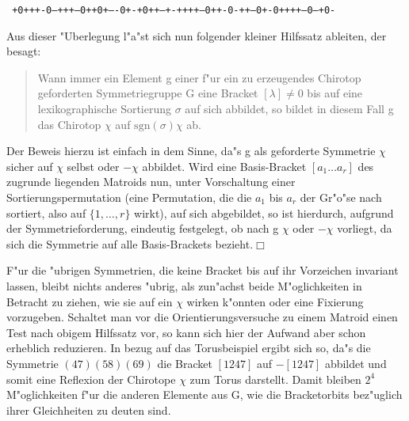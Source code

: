 \centerline{\small\tt
+0+++-0--+++--0++0+----0+-+0++---+-++++---0++-0-++--0+-0++++---0---+0-
}\vskip4mm

Aus dieser "Uberlegung l"a"st sich nun folgender kleiner Hilfssatz ableiten, der
besagt:
\begin{quote}
Wann immer ein Element g einer f"ur ein zu erzeugendes Chirotop geforderten
Symmetriegruppe G eine Bracket $[\lambda]\neq 0$ bis auf eine lexikographische
Sortierung $\sigma$ auf sich abbildet, so bildet in diesem Fall g das
Chirotop $\chi$ auf $\mbox{sgn}(\sigma)\chi$ ab.
\end{quote}
Der Beweis hierzu ist einfach in dem Sinne, da"s g als geforderte Symmetrie
$\chi$ sicher auf $\chi$ selbst oder $-\chi$ abbildet. Wird eine Basis-Bracket
$[a_1\ldots a_r]$ des zugrunde liegenden Matroids nun, unter Vorschaltung einer
Sortierungspermutation (eine Permutation, die die $a_1$ bis $a_r$ der Gr"o"se
nach sortiert, also auf $\{1,\ldots,r\}$ wirkt), auf sich abgebildet, so ist
hierdurch, aufgrund der Symmetrieforderung, eindeutig festgelegt, ob nach g
$\chi$ oder $-\chi$ vorliegt, da sich die Symmetrie auf alle Basis-Brackets
bezieht.$\Box$

F"ur die "ubrigen Symmetrien, die keine Bracket bis auf ihr Vorzeichen
invariant lassen, bleibt nichts anderes "ubrig, als zun"achst beide
M"oglichkeiten in Betracht zu ziehen, wie sie auf ein $\chi$ wirken k"onnten
oder eine Fixierung vorzugeben. Schaltet man vor die Orientierungsversuche zu
einem Matroid einen Test nach obigem Hilfssatz vor, so kann sich hier der
Aufwand aber schon erheblich reduzieren. In bezug auf das Torusbeispiel ergibt
sich so, da"s die Symmetrie $(47)(58)(69)$ die Bracket $[1247]$ auf $-[1247]$
abbildet und somit eine Reflexion der Chirotope $\chi$ zum Torus darstellt.
Damit bleiben $2^4$ M"oglichkeiten f"ur die anderen Elemente aus G, wie die
Bracketorbits bez"uglich ihrer Gleichheiten zu deuten sind.

